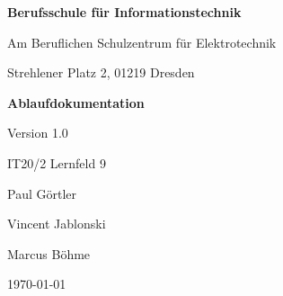 \documentclass{scrartcl}
\begin{document}
\begin{center}
    \thispagestyle{empty}
    \textbf{Berufsschule für Informationstechnik}

    Am Beruflichen Schulzentrum für Elektrotechnik

    Strehlener Platz 2, 01219 Dresden
    
    \vfill 
        \LARGE{\textbf{Ablaufdokumentation}}
        \linebreak
        
        \large{Version 1.0}
        \linebreak
        \linebreak

        \large{IT20/2}
        \linebreak
        \large{Lernfeld 9}
        \linebreak
        \linebreak

        \large{Paul Görtler}
        
        \large{Vincent Jablonski}  

        \large{Marcus Böhme}  
        \linebreak

        \large \today
    \vfill    
\end{center}
\newpage
\setcounter{page}{1}

\tableofcontents
\newpage
\end{document}

